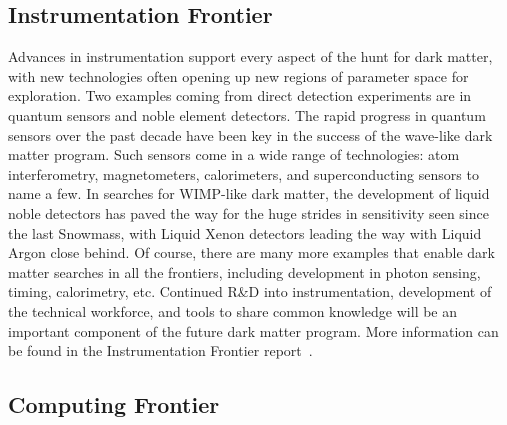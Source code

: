\documentclass[nofootinbib]{article}
\begin{document}
\begin{itemize}

\end{itemize}

\subsection{Instrumentation Frontier}
Advances in instrumentation support every aspect of the hunt for dark matter, with new technologies often opening up new regions of parameter space for exploration. Two examples coming from direct detection experiments are in quantum sensors and noble element detectors. The rapid progress in quantum sensors over the past decade have been key in the success of the wave-like dark matter program. Such sensors come in a wide range of technologies: atom interferometry, magnetometers, calorimeters, and superconducting sensors to name a few. In searches for WIMP-like dark matter, the development of liquid noble detectors has paved the way for the huge strides in sensitivity seen since the last Snowmass, with Liquid Xenon detectors leading the way with Liquid Argon close behind. Of course, there are many more examples that enable dark matter searches in all the frontiers, including development in photon sensing, timing, calorimetry, etc. Continued R\&D into instrumentation, development of the technical workforce, and tools to share common knowledge will be an important component of the future dark matter program. More information can be found in the Instrumentation Frontier report~\cite{IFReport}. 

\subsection{Computing Frontier}

\end{document}
